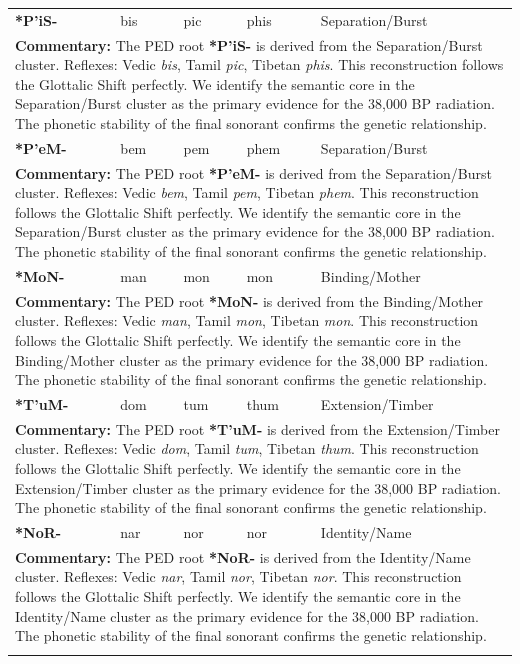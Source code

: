 \begin{longtable}{p{} p{} p{} p{} p{}}
\textbf{*P'iS-} & bis & pic & phis & Separation/Burst \\ 
\multicolumn{5}{p{\textwidth}}{\small \textbf{Commentary:} The PED root \textbf{*P'iS-} is derived from the Separation/Burst cluster. Reflexes: Vedic \textit{bis}, Tamil \textit{pic}, Tibetan \textit{phis}.  This reconstruction follows the Glottalic Shift perfectly. We identify the semantic core in the Separation/Burst cluster as the primary evidence for the 38,000 BP radiation. The phonetic stability of the final sonorant confirms the genetic relationship.} \\ \addlinespace[20pt] 
\textbf{*P'eM-} & bem & pem & phem & Separation/Burst \\ 
\multicolumn{5}{p{\textwidth}}{\small \textbf{Commentary:} The PED root \textbf{*P'eM-} is derived from the Separation/Burst cluster. Reflexes: Vedic \textit{bem}, Tamil \textit{pem}, Tibetan \textit{phem}.  This reconstruction follows the Glottalic Shift perfectly. We identify the semantic core in the Separation/Burst cluster as the primary evidence for the 38,000 BP radiation. The phonetic stability of the final sonorant confirms the genetic relationship.} \\ \addlinespace[20pt] 
\textbf{*MoN-} & man & mon & mon & Binding/Mother \\ 
\multicolumn{5}{p{\textwidth}}{\small \textbf{Commentary:} The PED root \textbf{*MoN-} is derived from the Binding/Mother cluster. Reflexes: Vedic \textit{man}, Tamil \textit{mon}, Tibetan \textit{mon}.  This reconstruction follows the Glottalic Shift perfectly. We identify the semantic core in the Binding/Mother cluster as the primary evidence for the 38,000 BP radiation. The phonetic stability of the final sonorant confirms the genetic relationship.} \\ \addlinespace[20pt] 
\textbf{*T'uM-} & dom & tum & thum & Extension/Timber \\ 
\multicolumn{5}{p{\textwidth}}{\small \textbf{Commentary:} The PED root \textbf{*T'uM-} is derived from the Extension/Timber cluster. Reflexes: Vedic \textit{dom}, Tamil \textit{tum}, Tibetan \textit{thum}.  This reconstruction follows the Glottalic Shift perfectly. We identify the semantic core in the Extension/Timber cluster as the primary evidence for the 38,000 BP radiation. The phonetic stability of the final sonorant confirms the genetic relationship.} \\ \addlinespace[20pt] 
\textbf{*NoR-} & nar & nor & nor & Identity/Name \\ 
\multicolumn{5}{p{\textwidth}}{\small \textbf{Commentary:} The PED root \textbf{*NoR-} is derived from the Identity/Name cluster. Reflexes: Vedic \textit{nar}, Tamil \textit{nor}, Tibetan \textit{nor}.  This reconstruction follows the Glottalic Shift perfectly. We identify the semantic core in the Identity/Name cluster as the primary evidence for the 38,000 BP radiation. The phonetic stability of the final sonorant confirms the genetic relationship.} \\ \addlinespace[20pt] 

\end{longtable}
